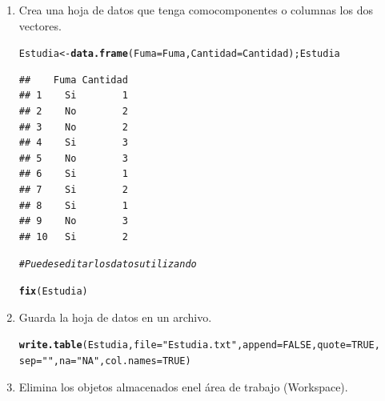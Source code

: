 \documentclass[12pt,letterpaper]{article}\usepackage[]{graphicx}\usepackage[]{color}
\makeatletter
\newcommand{\hlnum}[1]{\textcolor[rgb]{0.686,0.059,0.569}{#1}}%
\newcommand{\hlstr}[1]{\textcolor[rgb]{0.192,0.494,0.8}{#1}}%
\newcommand{\hlcom}[1]{\textcolor[rgb]{0.678,0.584,0.686}{\textit{#1}}}%
\newcommand{\hlstd}[1]{\textcolor[rgb]{0.345,0.345,0.345}{#1}}%
\newcommand{\hlkwb}[1]{\textcolor[rgb]{0.69,0.353,0.396}{#1}}%
\newcommand{\hlkwc}[1]{\textcolor[rgb]{0.333,0.667,0.333}{#1}}%
\newcommand{\hlkwd}[1]{\textcolor[rgb]{0.737,0.353,0.396}{\textbf{#1}}}%
\newenvironment{kframe}{%
 \def\at@end@of@kframe{}%
 \ifinner\ifhmode%
  \def\at@end@of@kframe{\end{minipage}}%
  \begin{minipage}{\columnwidth}%
 \fi\fi%
 \def\FrameCommand##1{\hskip\@totalleftmargin \hskip-\fboxsep
 \colorbox{shadecolor}{##1}\hskip-\fboxsep
     \hskip-\linewidth \hskip-\@totalleftmargin \hskip\columnwidth}%
 \MakeFramed {\advance\hsize-\width
   \@totalleftmargin\z@ \linewidth\hsize
   \@setminipage}}%
 {\par\unskip\endMakeFramed%
 \at@end@of@kframe}
\newenvironment{knitrout}{}{} %
\makeatother
\begin{document}
\begin{enumerate}
\item  Crea una hoja de datos que tenga comocomponentes o columnas los dos vectores.

\begin{knitrout}
\color{fgcolor}\begin{kframe}
\begin{alltt}
\hlstd{Estudia} \hlkwb{<-} \hlkwd{data.frame}\hlstd{(}\hlkwc{Fuma}\hlstd{=Fuma,} \hlkwc{Cantidad}\hlstd{=Cantidad); Estudia}
\end{alltt}
\begin{verbatim}
##    Fuma Cantidad
## 1    Si        1
## 2    No        2
## 3    No        2
## 4    Si        3
## 5    No        3
## 6    Si        1
## 7    Si        2
## 8    Si        1
## 9    No        3
## 10   Si        2
\end{verbatim}
\end{kframe}
\end{knitrout}

\begin{knitrout}
\color{fgcolor}\begin{kframe}
\begin{alltt}
\hlcom{# Puedes editar los datos utilizando }

\hlkwd{fix}\hlstd{(Estudia)}
\end{alltt}
\end{kframe}
\end{knitrout}

\item Guarda la hoja de datos en un archivo. 

\begin{knitrout}
\color{fgcolor}\begin{kframe}
\begin{alltt}
\hlkwd{write.table}\hlstd{(Estudia,} \hlkwc{file}\hlstd{=}\hlstr{"Estudia.txt"}\hlstd{,} \hlkwc{append}\hlstd{=}\hlnum{FALSE}\hlstd{,} \hlkwc{quote}\hlstd{=}\hlnum{TRUE}\hlstd{,}
            \hlkwc{sep}\hlstd{=}\hlstr{" "}\hlstd{,} \hlkwc{na}\hlstd{=}\hlstr{"NA"}\hlstd{,} \hlkwc{col.names}\hlstd{=}\hlnum{TRUE}\hlstd{)}
\end{alltt}
\end{kframe}
\end{knitrout}

\item Elimina los objetos almacenados enel \'area de trabajo (Workspace). 


\end{enumerate}
\end{document}
